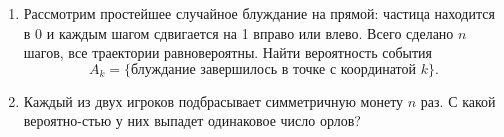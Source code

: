 \documentclass{article}
\begin{document}
\begin{enumerate}[label*=\protect\fbox{\arabic{enumi}}]
\item Рассмотрим простейшее случайное блуждание на прямой: частица находится в 0 и каждым шагом сдвигается на 1 вправо или влево. Всего сделано $n$ шагов, все траектории равновероятны. Найти вероятность события $$A_k = \{\text{блуждание завершилось в точке с координатой $k$}\}.$$

\item Каждый из двух игроков подбрасывает симметричную монету $n$ раз. С какой вероятно-стью у них выпадет одинаковое число орлов?


\end{enumerate}
\end{document}
